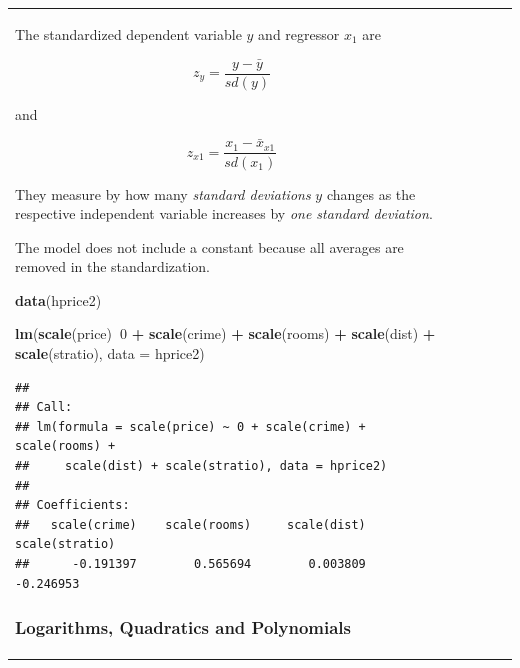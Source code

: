 \documentclass[]{book}
\newenvironment{Shaded}{\begin{snugshade}}{\end{snugshade}}
\newcommand{\DataTypeTok}[1]{\textcolor[rgb]{0.13,0.29,0.53}{#1}}
\newcommand{\DecValTok}[1]{\textcolor[rgb]{0.00,0.00,0.81}{#1}}
\newcommand{\KeywordTok}[1]{\textcolor[rgb]{0.13,0.29,0.53}{\textbf{#1}}}
\newcommand{\NormalTok}[1]{#1}
\newcommand{\OperatorTok}[1]{\textcolor[rgb]{0.81,0.36,0.00}{\textbf{#1}}}
\newcommand{\StringTok}[1]{\textcolor[rgb]{0.31,0.60,0.02}{#1}}
\begin{document}
\begin{tabularx}{0.455555555555556\textwidth}{p{} p{} p{} p{} p{}}
The standardized dependent variable \(y\) and regressor \(x_1\) are

\begin{equation}
z_y=\frac{y-\bar{y}}{sd(y)}
\end{equation}

and

\begin{equation}
z_{x1}=\frac{x_{1}-\bar{x}_{x1}}{sd(x_{1})}
\end{equation}

They measure by how many \emph{standard deviations} \(y\) changes as the
respective independent variable increases by \emph{one standard
deviation}.

The model does not include a constant because all averages are removed
in the standardization.

\begin{Shaded}
\begin{Highlighting}[]
\KeywordTok{data}\NormalTok{(hprice2)}
\end{Highlighting}
\end{Shaded}

\begin{Shaded}
\begin{Highlighting}[]
\KeywordTok{lm}\NormalTok{(}\KeywordTok{scale}\NormalTok{(price)}\OperatorTok{~}\DecValTok{0} \OperatorTok{+}\StringTok{  }\KeywordTok{scale}\NormalTok{(crime) }\OperatorTok{+}\StringTok{  }\KeywordTok{scale}\NormalTok{(rooms) }\OperatorTok{+}\StringTok{ }\KeywordTok{scale}\NormalTok{(dist) }\OperatorTok{+}\StringTok{  }\KeywordTok{scale}\NormalTok{(stratio), }\DataTypeTok{data =}\NormalTok{ hprice2)}
\end{Highlighting}
\end{Shaded}

\begin{verbatim}
## 
## Call:
## lm(formula = scale(price) ~ 0 + scale(crime) + scale(rooms) + 
##     scale(dist) + scale(stratio), data = hprice2)
## 
## Coefficients:
##   scale(crime)    scale(rooms)     scale(dist)  scale(stratio)  
##      -0.191397        0.565694        0.003809       -0.246953
\end{verbatim}

\hypertarget{logarithms-quadratics-and-polynomials}{%
\subsubsection{Logarithms, Quadratics and
Polynomials}\label{logarithms-quadratics-and-polynomials}}


\end{tabularx}
\end{document}
